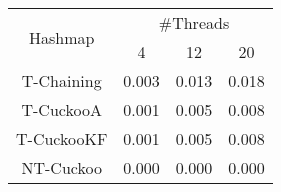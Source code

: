 \begin{tabular}{|c|c|c|c|}
\hline
\multirow{2}{*}{Hashmap} & \multicolumn{3}{c|}{\#Threads}\\\cline{2-4}& 4 & 12 & 20\\
\hline
\hline
T-Chaining & 0.003 & 0.013 & 0.018\\
T-CuckooA & 0.001 & 0.005 & 0.008\\
T-CuckooKF & 0.001 & 0.005 & 0.008\\
NT-Cuckoo & 0.000 & 0.000 & 0.000\\
\hline
\end{tabular}
